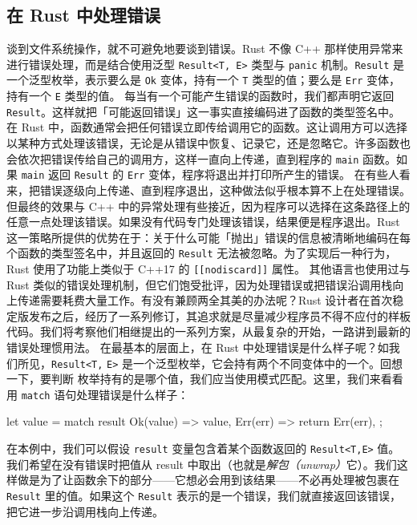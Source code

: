 \subsection{在 Rust 中处理错误}
\label{idx:idx_e65632f6}
谈到文件系统操作，就不可避免地要谈到错误。Rust 不像 C++ 那样使用异常来进行错误处理，而是结合使用泛型
\texttt{Result<\allowbreak{}T,\allowbreak{} E>\allowbreak{}} 类型与 \texttt{panic} 机制。\texttt{Result} 是一个泛型枚举，表示要么是
\texttt{Ok} 变体，持有一个 \texttt{T} 类型的值；要么是 \texttt{Err} 变体，持有一个 \texttt{E} 类型的值。
\label{idx:idx_1fdaa1f3}
每当有一个可能产生错误的函数时，我们都声明它返回 \texttt{Result}。这样就把「可能返回错误」这一事实直接编码进了函数的类型签名中。
\label{idx:idx_900e0288}
在 Rust 中，函数通常会把任何错误立即传给调用它的函数。这让调用方可以选择以某种方式处理该错误，无论是从错误中恢复、记录它，还是忽略它。许多函数也会依次把错误传给自己的调用方，这样一直向上传递，直到程序的 \texttt{main} 函数。如果 \texttt{main} 返回 \texttt{Result} 的 \texttt{Err} 变体，程序将退出并打印所产生的错误。
\label{idx:idx_e3314e29}
在有些人看来，把错误逐级向上传递、直到程序退出，这种做法似乎根本算不上在处理错误。但最终的效果与 C++ 中的异常处理有些接近，因为程序可以选择在这条路径上的任意一点处理该错误。如果没有代码专门处理该错误，结果便是程序退出。Rust 这一策略所提供的优势在于：关于什么可能「抛出」错误的信息被清晰地编码在每个函数的类型签名中，并且返回的 \texttt{Result} 无法被忽略。为了实现后一种行为，Rust 使用了功能上类似于 C++17 的
\texttt{[\allowbreak{}[\allowbreak{}nodiscard]\allowbreak{}]\allowbreak{}} 属性。
其他语言也使用过与 Rust 类似的错误处理机制，但它们饱受批评，因为处理错误或把错误沿调用栈向上传递需要耗费大量工作。有没有兼顾两全其美的办法呢？Rust 设计者在首次稳定版发布之后，经历了一系列修订，其追求就是尽量减少程序员不得不应付的样板代码。我们将考察他们相继提出的一系列方案，从最复杂的开始，一路讲到最新的错误处理惯用法。
在最基本的层面上，在 Rust 中处理错误是什么样子呢？如我们所见，\texttt{Result<T,}
\texttt{E>} 是一个泛型枚举，它会持有两个不同变体中的一个。回想一下，要判断
枚举持有的是哪个值，我们应当使用模式匹配。这里，我们来看看用 \texttt{match} 语句处理错误是什么样子：
\begin{codebox}[rust]
let value = match result {
    Ok(value) => value,
    Err(err) => return Err(err),
};
\end{codebox}
\label{idx:idx_5146fee9}
在本例中，我们可以假设 \texttt{result} 变量包含着某个函数返回的 \texttt{Result<T,E>} 值。我们希望在没有错误时把值从 result 中取出（也就是\emph{解包（unwrap）}它）。我们这样做是为了让函数余下的部分——它想必会用到该结果——不必再处理被包裹在 \texttt{Result} 里的值。如果这个 \texttt{Result} 表示的是一个错误，我们就直接返回该错误，把它进一步沿调用栈向上传递。

